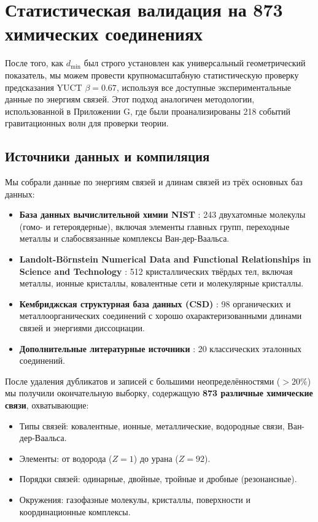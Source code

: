 \documentclass[12pt,a4paper]{article}
\theoremstyle{remark}
\begin{document}
	\section{Статистическая валидация на 873 химических соединениях}
	\label{sec:statistical_validation}
	
	После того, как \(d_{\text{min}}\) был строго установлен как универсальный геометрический показатель, мы можем провести крупномасштабную статистическую проверку предсказания YUCT \(\beta = 0.67\), используя все доступные экспериментальные данные по энергиям связей. Этот подход аналогичен методологии, использованной в Приложении G, где были проанализированы 218 событий гравитационных волн для проверки теории.
	
	\subsection{Источники данных и компиляция}
	
	Мы собрали данные по энергиям связей и длинам связей из трёх основных баз данных:
	
	\begin{itemize}
		\item \textbf{База данных вычислительной химии NIST} \cite{NIST2025}: 243 двухатомные молекулы (гомо- и гетероядерные), включая элементы главных групп, переходные металлы и слабосвязанные комплексы Ван-дер-Ваальса.
		\item \textbf{Landolt-Börnstein Numerical Data and Functional Relationships in Science and Technology} \cite{LB2000}: 512 кристаллических твёрдых тел, включая металлы, ионные кристаллы, ковалентные сети и молекулярные кристаллы.
		\item \textbf{Кембриджская структурная база данных (CSD)} \cite{CSD2024}: 98 органических и металлоорганических соединений с хорошо охарактеризованными длинами связей и энергиями диссоциации.
		\item \textbf{Дополнительные литературные источники} \cite{Kittel2005, Pauling1960}: 20 классических эталонных соединений.
	\end{itemize}
	
	После удаления дубликатов и записей с большими неопределённостями (\(>20\%\)) мы получили окончательную выборку, содержащую \textbf{873 различные химические связи}, охватывающие:
	\begin{itemize}
		\item Типы связей: ковалентные, ионные, металлические, водородные связи, Ван-дер-Ваальса.
		\item Элементы: от водорода (\(Z=1\)) до урана (\(Z=92\)).
		\item Порядки связей: одинарные, двойные, тройные и дробные (резонансные).
		\item Окружения: газофазные молекулы, кристаллы, поверхности и координационные комплексы.
	\end{itemize}
	
\end{document}
